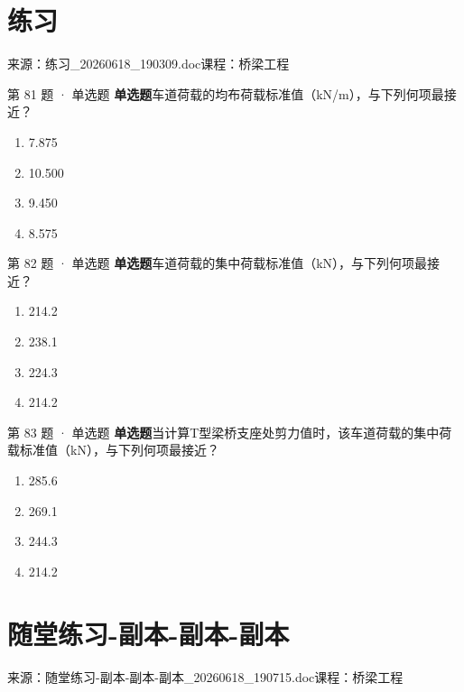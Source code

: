 \documentclass[UTF8,zihao=-4,openany]{ctexbook}
\newenvironment{choices}{\begin{enumerate}[label=\Alph*.,leftmargin=9mm,labelsep=3mm,itemsep=2pt,topsep=4pt]}{\end{enumerate}}
\newcommand{\qtype}[1]{\textcolor{brand}{\sffamily\bfseries #1}}
\newcommand{\sourcefile}[1]{\textcolor{muted}{\small\sffamily 来源：#1}}
\begin{document}
\chapter{练习}

\sourcefile{练习\_20260618\_190309.doc}\quad \textcolor{muted}{\small\sffamily 课程：桥梁工程}

\begin{questionbox}{第 81 题 · 单选题}
\qtype{单选题}\quad 车道荷载的均布荷载标准值（kN/m），与下列何项最接近？
\begin{choices}
\item 7.875
\item 10.500
\item 9.450
\item 8.575
\end{choices}
\end{questionbox}

\begin{questionbox}{第 82 题 · 单选题}
\qtype{单选题}\quad 车道荷载的集中荷载标准值（kN），与下列何项最接近？
\begin{choices}
\item 214.2
\item 238.1
\item 224.3
\item 214.2
\end{choices}
\end{questionbox}

\begin{questionbox}{第 83 题 · 单选题}
\qtype{单选题}\quad 当计算T型梁桥支座处剪力值时，该车道荷载的集中荷载标准值（kN），与下列何项最接近？
\begin{choices}
\item 285.6
\item 269.1
\item 244.3
\item 214.2
\end{choices}
\end{questionbox}

\chapter{随堂练习-副本-副本-副本}

\sourcefile{随堂练习-副本-副本-副本\_20260618\_190715.doc}\quad \textcolor{muted}{\small\sffamily 课程：桥梁工程}
\end{document}
